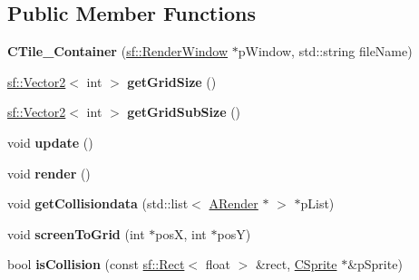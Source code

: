 \subsection*{Public Member Functions}
\begin{DoxyCompactItemize}
\item 
\hypertarget{classCTile__Container_abc66100f1acf33f6f5cec726533b583e}{{\bfseries C\-Tile\-\_\-\-Container} (\hyperlink{classsf_1_1RenderWindow}{sf\-::\-Render\-Window} $\ast$p\-Window, std\-::string file\-Name)}\label{classCTile__Container_abc66100f1acf33f6f5cec726533b583e}

\item 
\hypertarget{classCTile__Container_ae8a4d2b6e49fbec47d92cbb19bb9d3c7}{\hyperlink{classsf_1_1Vector2}{sf\-::\-Vector2}$<$ int $>$ {\bfseries get\-Grid\-Size} ()}\label{classCTile__Container_ae8a4d2b6e49fbec47d92cbb19bb9d3c7}

\item 
\hypertarget{classCTile__Container_a876984278369d0cafc24890959128ed0}{\hyperlink{classsf_1_1Vector2}{sf\-::\-Vector2}$<$ int $>$ {\bfseries get\-Grid\-Sub\-Size} ()}\label{classCTile__Container_a876984278369d0cafc24890959128ed0}

\item 
\hypertarget{classCTile__Container_abe6e19de544f042671094697bb83fde9}{void {\bfseries update} ()}\label{classCTile__Container_abe6e19de544f042671094697bb83fde9}

\item 
\hypertarget{classCTile__Container_ab23db13d6879e46e8441df2de2d522e5}{void {\bfseries render} ()}\label{classCTile__Container_ab23db13d6879e46e8441df2de2d522e5}

\item 
\hypertarget{classCTile__Container_ad22112332743b050e08dda43b9c1e167}{void {\bfseries get\-Collisiondata} (std\-::list$<$ \hyperlink{classARender}{A\-Render} $\ast$ $>$ $\ast$p\-List)}\label{classCTile__Container_ad22112332743b050e08dda43b9c1e167}

\item 
\hypertarget{classCTile__Container_a14f90644c3a992813a629cea3e81aa38}{void {\bfseries screen\-To\-Grid} (int $\ast$pos\-X, int $\ast$pos\-Y)}\label{classCTile__Container_a14f90644c3a992813a629cea3e81aa38}

\item 
\hypertarget{classCTile__Container_adfda15836508531632c4ca506caf6360}{bool {\bfseries is\-Collision} (const \hyperlink{classsf_1_1Rect}{sf\-::\-Rect}$<$ float $>$ \&rect, \hyperlink{classCSprite}{C\-Sprite} $\ast$\&p\-Sprite)}\label{classCTile__Container_adfda15836508531632c4ca506caf6360}


\end{DoxyCompactItemize}
